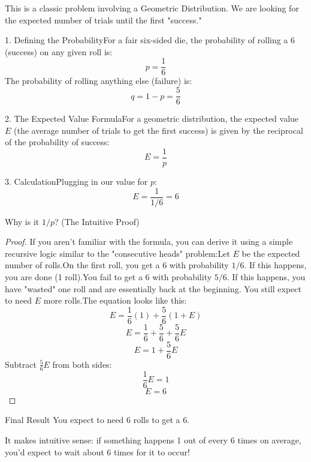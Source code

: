 \documentclass{report}
\begin{document}
\begin{sol}
    
    This is a classic problem involving a Geometric Distribution. We are looking for the expected number of trials until the first "success."
    
    1. Defining the ProbabilityFor a fair six-sided die, the probability of rolling a 6 (success) on any given roll is:$$p = \frac{1}{6}$$The probability of rolling anything else (failure) is:$$q = 1 - p = \frac{5}{6}$$
    
    2. The Expected Value FormulaFor a geometric distribution, the expected value $E$ (the average number of trials to get the first success) is given by the reciprocal of the probability of success:$$E = \frac{1}{p}$$
    
    3. CalculationPlugging in our value for $p$:$$E = \frac{1}{1/6} = 6$$

    Why is it $1/p$? (The Intuitive Proof)

    \begin{proof}
        If you aren't familiar with the formula, you can derive it using a simple recursive logic similar to the "consecutive heads" problem:Let $E$ be the expected number of rolls.On the first roll, you get a 6 with probability $1/6$. If this happens, you are done (1 roll).You fail to get a 6 with probability $5/6$. If this happens, you have "wasted" one roll and are essentially back at the beginning. You still expect to need $E$ more rolls.The equation looks like this:$$E = \frac{1}{6}(1) + \frac{5}{6}(1 + E)$$$$E = \frac{1}{6} + \frac{5}{6} + \frac{5}{6}E$$$$E = 1 + \frac{5}{6}E$$Subtract $\frac{5}{6}E$ from both sides:$$\frac{1}{6}E = 1$$$$E = 6$$
    \end{proof}

    Final Result
    You expect to need 6 rolls to get a 6.

    It makes intuitive sense: if something happens 1 out of every 6 times on average, you'd expect to wait about 6 times for it to occur!

\end{sol}




\begin{sol}



\end{sol}

\end{document}
